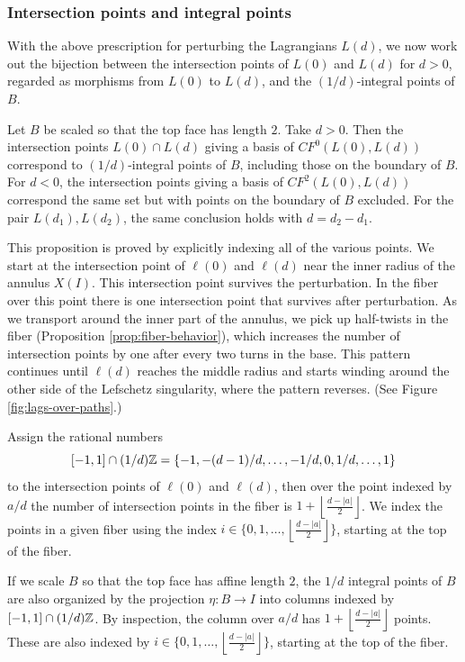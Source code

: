 \documentclass[12pt]{amsart}
\begin{document}
\subsubsection{Intersection points and integral points}
\label{sec:intersections}

With the above prescription for perturbing the Lagrangians $L(d)$, we
now work out the bijection between the intersection points of $L(0)$
and $L(d)$ for $d>0$, regarded as morphisms from $L(0)$ to $L(d)$, and
the $(1/d)$-integral points of $B$.

\begin{proposition}
  Let $B$ be scaled so that the top face has length $2$. Take $d > 0$. Then the intersection points $L(0) \cap L(d)$ giving a basis of $CF^0(L(0),L(d))$ correspond to $(1/d)$-integral points of $B$, including those on the boundary of $B$. For $d < 0$, the intersection points giving a basis of $CF^2(L(0),L(d))$ correspond the same set but with points on the boundary of $B$ excluded. For the pair $L(d_1),L(d_2)$, the same conclusion holds with $d = d_2 - d_1$. 
\end{proposition}

This proposition is proved by explicitly indexing all of the various points. We start at the intersection point of $\ell(0)$ and $\ell(d)$ near the
inner radius of the annulus $X(I)$. This intersection point survives
the perturbation. In the fiber over this point there is one
intersection point that survives after perturbation. As we transport
around the inner part of the annulus, we pick up half-twists in the
fiber (Proposition \ref{prop:fiber-behavior}), which increases the number of intersection points by one after
every two turns in the base. This pattern continues until $\ell(d)$
reaches the middle radius and starts winding around the other side of
the Lefschetz singularity, where the pattern reverses. (See Figure
\ref{fig:lags-over-paths}.)

Assign the rational numbers \[[-1,1] \cap (1/d)\mathbb{Z} = \{-1,
-(d-1)/d,\dots, -1/d, 0, 1/d, \dots, 1\}\] to the intersection points
of $\ell(0)$ and $\ell(d)$, then over the point indexed by $a/d$ the
number of intersection points in the fiber is $1+\left\lfloor\frac{d-|a|}{2}\right\rfloor$. We index the points in a given fiber using the index $i \in \{0,1,\dots, \left\lfloor\frac{d-|a|}{2}\right\rfloor\}$, starting at the top of the fiber.

If we scale $B$ so that the top face has affine length $2$, the $1/d$
integral points of $B$ are also organized by the projection $\eta: B \to I$
into columns indexed by $[-1,1] \cap (1/d)\mathbb{Z}$. By inspection, the column over
$a/d$ has $1+ \left\lfloor\frac{d-|a|}{2}\right\rfloor$ points. These are also indexed by $i \in \{0,1,\dots, \left\lfloor\frac{d-|a|}{2}\right\rfloor\}$, starting at the top of the fiber.
\end{document}
